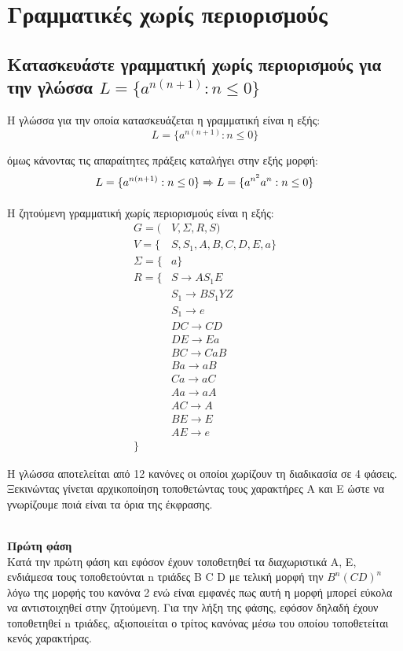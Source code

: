 \section{Γραμματικές χωρίς περιορισμούς}
\subsection{Κατασκευάστε γραμματική χωρίς περιορισμούς για την γλώσσα $L = \{a^{n(n+1)} : n \leq 0\}$}

\noindent
Η γλώσσα για την οποία κατασκευάζεται η γραμματική είναι η εξής:
\begin{equation*}
	L = \{a^{n(n+1)} : n \leq 0\}
\end{equation*}

όμως κάνοντας τις απαραίτητες πράξεις καταλήγει στην εξής μορφή:
\begin{equation*}
	L = \{a^{n(n+1)} : n \leq 0\} \xRightarrow{}  L = \{a^{n^2} a^n : n \leq 0\}
\end{equation*}

\noindent
Η ζητούμενη γραμματική χωρίς περιορισμούς είναι η εξής:
\begin{align*}
	G = (&V, Σ, R, S)\\
	V = \{&S, S_1, A, B, C, D, E, a\}\\
	Σ = \{&a\}\\
	R = \{& S \xrightarrow{} AS_1E\\
	& S_1 \xrightarrow{} BS_1YZ\\
	& S_1 \xrightarrow{} e\\
	& DC \xrightarrow{} CD\\
	& DE \xrightarrow{} Ea\\
	& BC \xrightarrow{} CaB\\
	& Ba \xrightarrow{} aB\\
	& Ca \xrightarrow{} aC\\
	& Aa \xrightarrow{} aA\\
	& AC \xrightarrow{} A\\
	& BE \xrightarrow{} E\\
	& ΑΕ \xrightarrow{} e\\\}
\end{align*}


\noindent
Η γλώσσα αποτελείται από 12 κανόνες οι οποίοι χωρίζουν τη διαδικασία σε 4 φάσεις. Ξεκινώντας γίνεται αρχικοποίηση τοποθετώντας τους χαρακτήρες Α και Ε ώστε να γνωρίζουμε ποιά είναι τα όρια της έκφρασης.

\noindent\\
\textbf{Πρώτη φάση}\\
Κατά την πρώτη φάση και εφόσον έχουν τοποθετηθεί τα διαχωριστικά Α, Ε, ενδιάμεσα τους τοποθετούνται n τριάδες Β C D με τελική μορφή την $B^n(CD)^n$ λόγω της μορφής του κανόνα 2 ενώ είναι εμφανές πως αυτή η μορφή μπορεί εύκολα να αντιστοιχηθεί στην ζητούμενη.  Για την λήξη της φάσης, εφόσον δηλαδή έχουν τοποθετηθεί n τριάδες, αξιοποιείται ο τρίτος κανόνας μέσω του οποίου τοποθετείται κενός χαρακτήρας.

